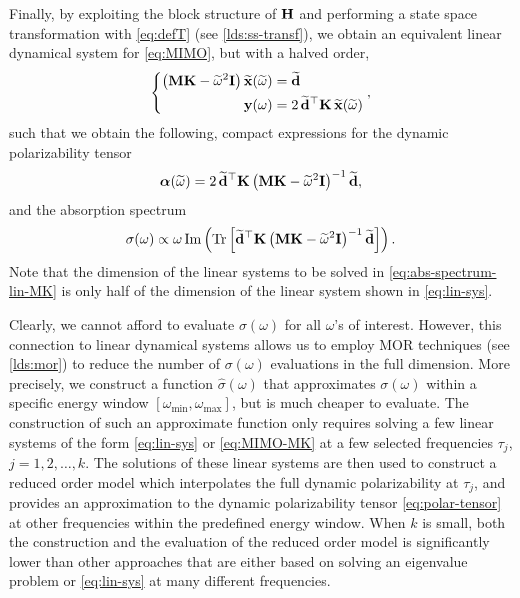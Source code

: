Finally, by exploiting the block structure of $\mathbf{H}$ and performing a state space transformation with \eqref{eq:defT} (see \cref{lds:ss-transf}), we obtain an equivalent linear dynamical system for \eqref{eq:MIMO}, but with a halved order,
\begin{equation}
  \left\{\begin{aligned}
    \left( \mathbf{M}\mathbf{K} - \widetilde{\omega}^2\mathbf{I} \right) \widetilde{\mathbf{x}}(\widetilde{\omega}) &= \widetilde{\mathbf{d}} \\
                                           \mathbf{y}(\omega) &= 2\,\widetilde{\mathbf{d}}^\top \mathbf{K}\,\widetilde{\mathbf{x}}(\widetilde{\omega})
  \end{aligned}\right.,
  \label{eq:MIMO-MK}
\end{equation}
such that we obtain the following, compact expressions for the dynamic polarizability tensor
\begin{equation}
  \boldsymbol{\alpha}(\widetilde{\omega}) = 2\,\widetilde{\mathbf{d}}^\top \mathbf{K} \left( \mathbf{M}\mathbf{K} - \widetilde{\omega}^2\mathbf{I} \right)^{-1} \widetilde{\mathbf{d}},
  \label{eq:polar-tensor-lin-MK}
\end{equation}
and the absorption spectrum
\begin{equation}
  \sigma(\omega) \propto \omega \operatorname{Im}\left(\operatorname{Tr}\left[ \widetilde{\mathbf{d}}^\top \mathbf{K} \left( \mathbf{M}\mathbf{K} - \widetilde{\omega}^2\mathbf{I} \right)^{-1} \widetilde{\mathbf{d}} \right]\right).
  \label{eq:abs-spectrum-lin-MK}
\end{equation}
Note that the dimension of the linear systems to be solved in \eqref{eq:abs-spectrum-lin-MK} is only half of the dimension of the linear system shown in \eqref{eq:lin-sys}.

Clearly, we cannot afford to evaluate $\sigma(\omega)$ for all $\omega$'s of interest. However, this connection to linear dynamical systems allows us to employ MOR techniques (see \cref{lds:mor}) to reduce the number of $\sigma(\omega)$ evaluations in the full dimension. More precisely, we construct a function $\hat{\sigma}(\omega)$ that approximates $\sigma(\omega)$ within a specific energy window $[\omega_\mathrm{min},\omega_\mathrm{max}]$, but is much cheaper to evaluate.  The construction of such an approximate function only requires solving a few linear systems of the form \eqref{eq:lin-sys} or \eqref{eq:MIMO-MK} at a few selected frequencies $\tau_j$, $j = 1,2,\ldots,k$. The solutions of these linear systems are then used to construct a reduced order model which interpolates the full dynamic polarizability at $\tau_j$, and provides an approximation to the dynamic polarizability tensor \eqref{eq:polar-tensor} at other frequencies within the predefined energy window. When $k$ is small, both the construction and the evaluation of the reduced order model is significantly lower than other approaches that are either based on solving an eigenvalue problem or \eqref{eq:lin-sys} at many different frequencies.

